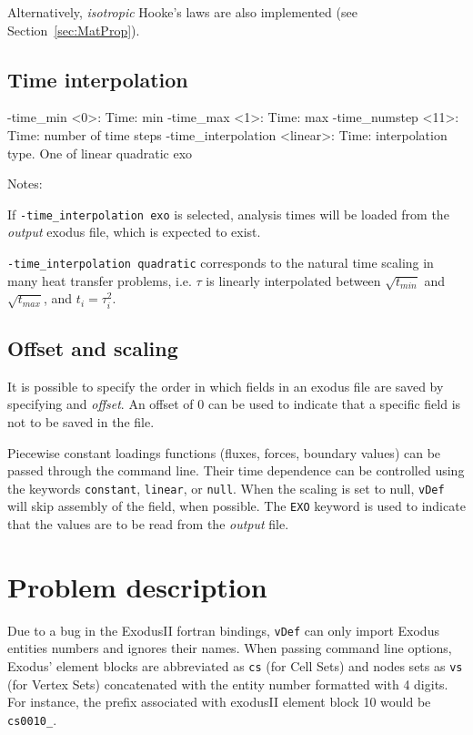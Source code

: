 \documentclass[10pt,oneside]{memoir}
\def\vDef{{\texttt{vDef}} }
\begin{document}
Alternatively, \emph{isotropic} Hooke's laws are also implemented (see Section~\ref{sec:MatProp}).


\subsection{Time interpolation}
\small{
\begin{boxedverbatim}
-time_min <0>: Time: min 
-time_max <1>: Time: max 
-time_numstep <11>: Time: number of time steps 
-time_interpolation <linear>: Time: interpolation type. One of linear quadratic exo
\end{boxedverbatim}
}
Notes: 

\begin{compactenum}
	\item If \verb+-time_interpolation exo+ is selected, analysis times will be loaded from the \emph{output} exodus file, which is expected to exist.
	\item \verb+-time_interpolation quadratic+ corresponds to the natural time scaling in many heat transfer problems, i.e. $\tau$ is linearly interpolated between $\sqrt{t_{min}}$ and $\sqrt{t_{max}}$, and $t_i = \tau_i^2$.
\end{compactenum}

\subsection{Offset and scaling}
It is possible to specify the order in which fields in an exodus file are saved by specifying and \emph{offset}. An offset of 0 can be used to indicate that a specific field is not to be saved in the file.

Piecewise constant loadings functions (fluxes, forces, boundary values) can be passed through the command line. Their time dependence can be controlled using the keywords \verb+constant+, \verb+linear+, or \verb+null+. When the scaling is set to null, \vDef will skip assembly of the field, when possible. The \verb+EXO+ keyword is used to indicate that the values are to be read from the \emph{output} file.

\section{Problem description}
Due to a bug in the ExodusII fortran bindings, \vDef can only import Exodus entities numbers and ignores their names. When passing command line options, Exodus' element blocks are abbreviated as \verb+cs+ (for Cell Sets) and nodes sets as \verb+vs+ (for Vertex Sets) concatenated with the entity number formatted with 4 digits. For instance, the prefix associated with exodusII element block 10 would be \verb+cs0010_+.
\end{document}
